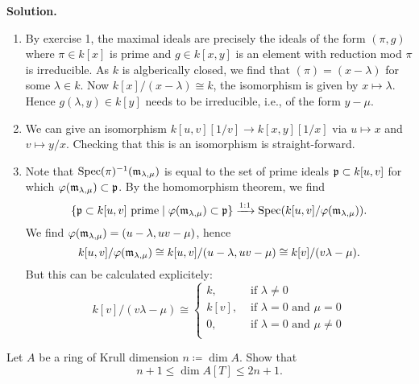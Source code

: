 \documentclass[a4paper,11pt]{article}
\begin{document}
\textbf{Solution.}
\begin{enumerate}
    \item By exercise 1, the maximal ideals are precisely the ideals of the 
        form $(\pi, g)$ where $\pi \in k[x]$ is prime and $g \in k[x,y]$ is an
        element with reduction mod $\pi$ is irreducible. As $k$ is algberically
        closed, we find that $(\pi) = (x-\lambda)$ for some $\lambda \in k$.
        Now $k[x]/(x-\lambda) \cong k$, the isomorphism is given by $x \mapsto 
        \lambda$. Hence $g(\lambda, y) \in k[y]$ needs to be irreducible, 
        i.e., of the form $y - \mu$. 
    \item We can give an isomorphism $k[u,v][1/v] \to k[x,y][1/x]$ via
        $u \mapsto x$ and $v \mapsto y/x$. Checking that this is an isomorphism
        is straight-forward. 
    \item Note that $\operatorname{Spec}(\pi)^{-1}(\mathfrak{m}_{\lambda, \mu})$ is equal to the set of
        prime ideals $\mathfrak{p} \subset k[u,v]$ for which $\varphi(\mathfrak{m}_{\lambda, \mu})
        \subset \mathfrak{p}$. By the homomorphism theorem, we find
        \begin{equation*}
            \{\mathfrak{p} \subset k[u,v] \text{ prime} \mid \varphi(\mathfrak{m}_{\lambda, \mu})
            \subset \mathfrak{p}\} \xrightarrow{1:1} \operatorname{Spec}(k[u,v]/\varphi(\mathfrak{m}_{\lambda, \mu})).
        \end{equation*}
        We find $\varphi(\mathfrak{m}_{\lambda, \mu}) = (u - \lambda, uv - \mu)$, hence 
        $$k[u,v] / \varphi(\mathfrak{m}_{\lambda, \mu}) \cong k[u,v]/(u - \lambda, uv - \mu)
        \cong k[v]/(v \lambda - \mu).$$
        But this can be calculated explicitely:
        \begin{equation*}
            k[v]/(v \lambda - \mu) \cong \begin{cases}
                k, &\text{ if } \lambda \neq 0 \\
                k[v], &\text{ if } \lambda = 0 \text{ and } \mu = 0\\
                0, &\text{ if } \lambda = 0 \text{ and } \mu \neq 0\\
            \end{cases}
        \end{equation*}
\end{enumerate}

    Let $A$ be a ring of Krull dimension $n \coloneqq \dim A$. Show that 
    \begin{equation*}
        n+1 \leq \dim A[T] \leq 2n + 1.
    \end{equation*}
\end{document}
